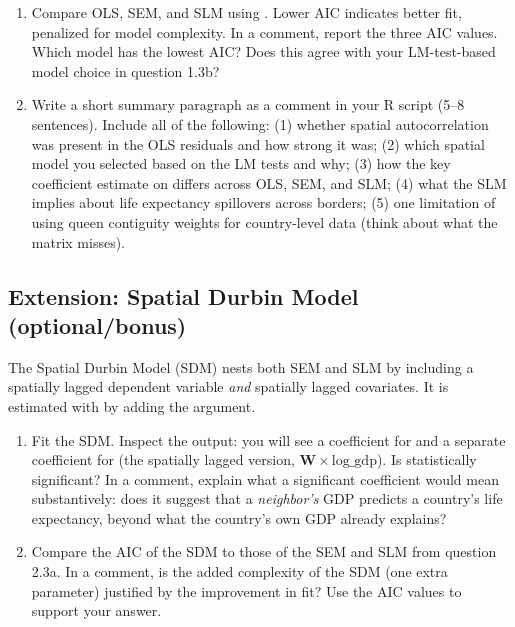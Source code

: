 \begin{enumerate}[label=\alph*)]

  \item Compare OLS, SEM, and SLM using . Lower AIC indicates better fit, penalized for model complexity. In a comment, report the three AIC values. Which model has the lowest AIC? Does this agree with your LM-test-based model choice in question 1.3b?

  \item Write a short summary paragraph as a comment in your R script (5--8 sentences). Include all of the following: (1) whether spatial autocorrelation was present in the OLS residuals and how strong it was; (2) which spatial model you selected based on the LM tests and why; (3) how the key coefficient estimate on  differs across OLS, SEM, and SLM; (4) what the SLM implies about life expectancy spillovers across borders; (5) one limitation of using queen contiguity weights for country-level data (think about what the matrix misses).

\end{enumerate}

\subsection{Extension: Spatial Durbin Model (optional/bonus)}

The Spatial Durbin Model (SDM) nests both SEM and SLM by including a spatially lagged dependent variable \textit{and} spatially lagged covariates. It is estimated with  by adding the  argument.

\begin{enumerate}[label=\alph*)]

  \item Fit the SDM. Inspect the output: you will see a coefficient for  and a separate coefficient for  (the spatially lagged version, $\mathbf{W} \times \text{log\_gdp}$). Is  statistically significant? In a comment, explain what a significant  coefficient would mean substantively: does it suggest that a \textit{neighbor's} GDP predicts a country's life expectancy, beyond what the country's own GDP already explains?

  \item Compare the AIC of the SDM to those of the SEM and SLM from question 2.3a. In a comment, is the added complexity of the SDM (one extra parameter) justified by the improvement in fit? Use the AIC values to support your answer.

\end{enumerate}

